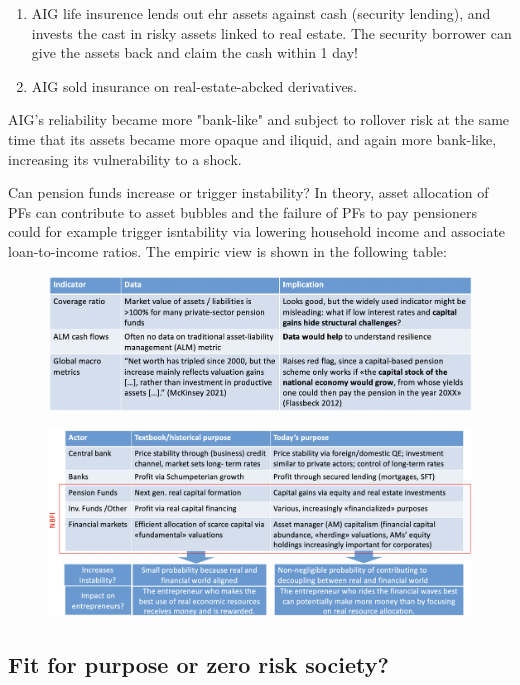 \documentclass[a4paper]{extarticle}
\begin{document}
\begin{enumerate}
    \item AIG life insurence lends out ehr assets against cash (security lending), and invests the cast in risky assets linked to real estate. The security borrower can give the assets back and claim the cash within 1 day!
    \item AIG sold insurance on real-estate-abcked derivatives.
\end{enumerate}

AIG's reliability became more "bank-like" and subject to rollover risk at the same time that its assets became more opaque and iliquid, and again more bank-like, increasing its vulnerability to a shock.

Can pension funds increase or trigger instability? In theory, asset allocation of PFs can contribute to asset bubbles and the failure of PFs to pay pensioners could for example trigger isntability via lowering household income and associate loan-to-income ratios. The empiric view is shown in the following table:

\begin{figure}[H]
    \includegraphics[width=15cm]{../images/EnpRisk_Fig12-2}
    \centering
\end{figure}

\begin{figure}[H]
    \includegraphics[width=15cm]{../images/EnpRisk_Fig12-3}
    \centering
\end{figure}

\subsection{Fit for purpose or zero risk society?}
\end{document}
